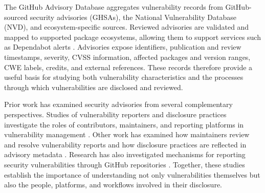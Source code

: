 \documentclass[smallextended,natbib]{svjour3}
\begin{document}
The GitHub Advisory Database aggregates vulnerability records from
GitHub-sourced security advisories (GHSAs), the National Vulnerability
Database (NVD), and ecosystem-specific sources. Reviewed advisories are
validated and mapped to supported package ecosystems, allowing them to
support services such as Dependabot alerts
\citep{AboutGithubAdvisoryDatabase,AboutDependabotAlets}. Advisories expose
identifiers, publication and review timestamps, severity, CVSS information,
affected packages and version ranges, CWE labels, credits, and external
references. These records therefore provide a useful basis for studying both
vulnerability characteristics and the processes through which vulnerabilities
are disclosed and reviewed.

Prior work has examined security advisories from several complementary
perspectives. Studies of vulnerability reporters and disclosure practices
investigate the roles of contributors, maintainers, and reporting platforms
in vulnerability management
\citep{alexopoulos2021vulnerability,ayala2025mixed}. Other work has examined
how maintainers review and resolve vulnerability reports and how disclosure
practices are reflected in advisory metadata
\citep{ayala2025deep,ayala2024poster,ayala2025investigating}.
Research has also investigated mechanisms for reporting security
vulnerabilities through GitHub repositories
\citep{kancharoendee2025categorizing}. Together, these studies establish the
importance of understanding not only vulnerabilities themselves but also
the people, platforms, and workflows involved in their disclosure.
\end{document}
